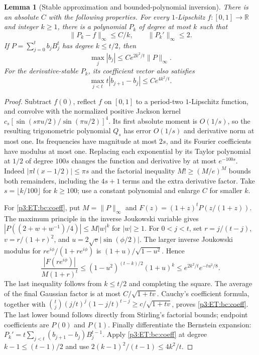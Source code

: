 \documentclass[11pt,a4paper]{article}
\newtheorem{lemma}[theorem]{Lemma}
\theoremstyle{definition}
\theoremstyle{remark}
\numberwithin{equation}{section}
\begin{document}
\begin{lemma}[Stable approximation and bounded-polynomial inversion]
\label{p3:ET:bc:approx}
There is an absolute $C$ with the following properties.
For every $1$-Lipschitz $f:[0,1]\to\mathbb R$ and integer $k\ge1$, there
is a polynomial $P_k$ of degree at most $k$ such that
\[
 \|P_k-f\|_\infty\le C/k,\qquad \|P_k'\|_\infty\le2.
\]
If $P=\sum_{j=0}^t b_jB_j^t$ has degree $k\le t/2$, then
\begin{equation}\label{p3:ET:bc:coeff}
 \max_j|b_j|\le Ce^{2k^2/t}\|P\|_\infty.
\end{equation}
For the derivative-stable $P_k$, its coefficient vector also satisfies
\begin{equation}\label{p3:ET:bc:coefflip}
 \max_{j<t}t|b_{j+1}-b_j|\le Ce^{4k^2/t}.
\end{equation}
\end{lemma}
\begin{proof}
Subtract $f(0)$, reflect $f$ on $[0,1]$ to a period-two $1$-Lipschitz
function, and convolve with the normalized positive Jackson kernel
$c_s[\sin(s\pi u/2)/\sin(\pi u/2)]^4$. Its first absolute moment is
$O(1/s)$, so the resulting trigonometric polynomial $Q_s$ has error
$O(1/s)$ and derivative norm at most one. Its frequencies have magnitude
at most $2s$, and its Fourier coefficients have modulus at most one.
Replacing each exponential by its Taylor polynomial at $1/2$ of degree
$100s$ changes the function and derivative by at most $e^{-100s}$.
Indeed $|\pi l(x-1/2)|\le\pi s$ and the factorial inequality
$M!\ge(M/e)^M$ bounds both remainders, including the $4s+1$ terms and the
extra derivative factor. Take $s=\lfloor k/100\rfloor$ for $k\ge100$;
use a constant polynomial and enlarge $C$ for smaller $k$.

For \eqref{p3:ET:bc:coeff}, put $M=\|P\|_\infty$ and
$F(z)=(1+z)^tP(z/(1+z))$. The maximum principle in the inverse Joukowski
variable gives
$|P((2+w+w^{-1})/4)|\le M|w|^k$ for $|w|\ge1$.
For $0<j<t$, set $r=j/(t-j)$, $v=r/(1+r)^2$, and
$u=2\sqrt v|\sin(\phi/2)|$. The larger inverse Joukowski modulus for
$re^{i\phi}/(1+re^{i\phi})$ is $(1+u)/\sqrt{1-u^2}$. Hence
\[
 \frac{|F(re^{i\phi})|}{M(1+r)^t}
 \le(1-u^2)^{(t-k)/2}(1+u)^k
 \le e^{2k^2/t}e^{-tu^2/8}.
\]
The last inequality follows from $k\le t/2$ and completing the square.
The average of the final Gaussian factor is at most
$C/\sqrt{1+tv}$. Cauchy's coefficient formula, together with
$\binom tj(j/t)^j(1-j/t)^{t-j}\ge c/\sqrt{1+tv}$, proves
\eqref{p3:ET:bc:coeff}. The last lower bound follows directly from Stirling's
factorial bounds; endpoint coefficients are $P(0)$ and $P(1)$.
Finally differentiate the Bernstein expansion:
$P_k'=t\sum_{j<t}(b_{j+1}-b_j)B_j^{t-1}$.
Apply \eqref{p3:ET:bc:coeff} at degree $k-1\le(t-1)/2$ and use
$2(k-1)^2/(t-1)\le4k^2/t$.
\end{proof}
\end{document}
